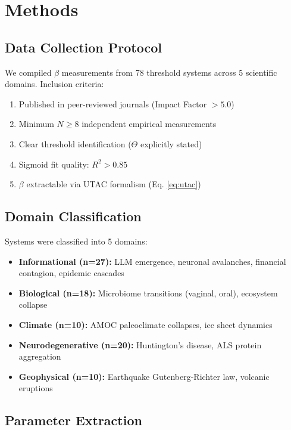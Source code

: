 \documentclass[11pt,a4paper]{article}
\begin{document}
\section{Methods}
\label{sec:methods}

\subsection{Data Collection Protocol}

We compiled $\beta$ measurements from 78 threshold systems across 5 scientific domains. Inclusion criteria:

\begin{enumerate}
\item Published in peer-reviewed journals (Impact Factor $> 5.0$)
\item Minimum $N \geq 8$ independent empirical measurements
\item Clear threshold identification ($\Theta$ explicitly stated)
\item Sigmoid fit quality: $R^2 > 0.85$
\item $\beta$ extractable via UTAC formalism (Eq. \ref{eq:utac})
\end{enumerate}

\subsection{Domain Classification}

Systems were classified into 5 domains:

\begin{itemize}
\item \textbf{Informational (n=27):} LLM emergence, neuronal avalanches, financial contagion, epidemic cascades
\item \textbf{Biological (n=18):} Microbiome transitions (vaginal, oral), ecosystem collapse
\item \textbf{Climate (n=10):} AMOC paleoclimate collapses, ice sheet dynamics
\item \textbf{Neurodegenerative (n=20):} Huntington's disease, ALS protein aggregation
\item \textbf{Geophysical (n=10):} Earthquake Gutenberg-Richter law, volcanic eruptions
\end{itemize}

\subsection{Parameter Extraction}
\end{document}
